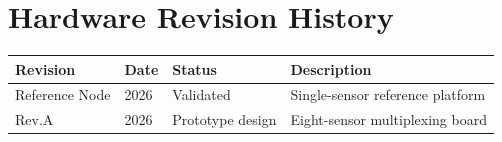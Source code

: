 \chapter{Hardware Revision History}

\begin{tabular}{llll}
\toprule
Revision & Date & Status & Description \\
\midrule
Reference Node & 2026 & Validated & Single-sensor reference platform \\
Rev.A & 2026 & Prototype design & Eight-sensor multiplexing board \\
\bottomrule
\end{tabular}
